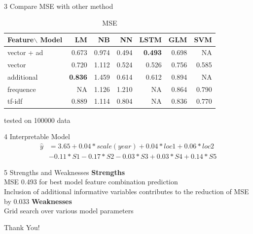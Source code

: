 \documentclass[10pt]{beamer}
\begin{document}
\begin{frame}{3 Compare MSE with other method}

\begin{table}[]
\centering
\caption*{\huge{MSE} }

\begin{tabular}{lrrrrrr}
Feature$\backslash$ Model &LM    & NB &NN  &LSTM  &GLM  & SVM \\
\hline
vector + ad   & 0.673     & 0.974  & 0.494   & \large\textbf{0.493}  & 0.698    & NA \\
vector        & 0.720     & 1.112  & 0.524   & 0.526  & 0.756    & 0.585  \\
additional            & \textbf{0.836}    & 1.459  & 0.614   & 0.612  & 0.894    & NA  \\
frequence     & NA & 1.126  & 1.210   & NA  & 0.864    & 0.790  \\
tf-idf        & 0.889 & 1.114 & 0.804   & NA  & 0.836    & 0.770  \\
\hline

\end{tabular}
\begin{tablenotes}
	\small
	\item tested on 100000 data
\end{tablenotes}

\end{table}

\end{frame}

\begin{frame}{4 Interpretable Model}
$$
\begin{aligned}
\hat{y} &=3.65+0.04* scale(year)+0.04*loc1+0.06*loc2\\
&-0.11*S1-0.17*S2-0.03*S3+0.03*S4+0.14*S5
\end{aligned}
$$


\end{frame}


\begin{frame}{5 Strengths and Weaknesses}
\textbf{Strengths} \\
MSE 0.493 for best model feature combination prediction\\
 Inclusion of additional informative variables contributes to the reduction of MSE by 0.033
 \newline
 \newline
\textbf{Weaknesses}\\
Grid search over various model parameters 
\end{frame}

\begin{frame}
\Huge{\centerline{Thank You!}}
\end{frame}
\end{document}
